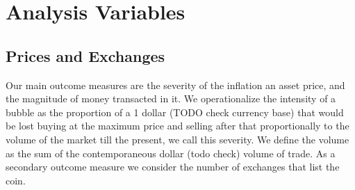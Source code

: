 
\section{Analysis Variables}
\subsection{Prices and Exchanges}
Our main outcome measures are the severity of the inflation an asset price, and the magnitude of money transacted in it.
We operationalize the intensity of a bubble as the proportion of a 1 dollar (TODO check currency base) that would be lost buying at the maximum price and selling after that proportionally to the volume of the market till the present, we call this severity.
We define the volume as the sum of the contemporaneous dollar (todo check) volume of trade.
As a secondary outcome measure we consider the number of exchanges that list the coin.


